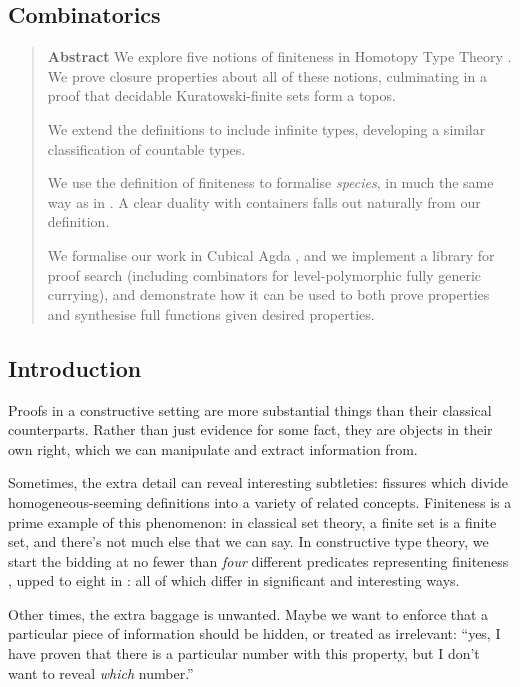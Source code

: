 \begin{refsection}
\newcommand{\pifun}[2]{\prod_{\left( \mathit{ #1 } : #2 \right)}}
\chapter{Combinatorics}
\begin{quote}
  \textbf{Abstract}
  We explore five notions of finiteness in Homotopy Type Theory \cite{hottbook}.
  We prove closure properties about all of these notions, culminating in a proof
  that decidable Kuratowski-finite sets form a topos.

  We extend the definitions to include infinite types, developing a similar
  classification of countable types.

  We use the definition of finiteness to formalise \emph{species}, in much
  the same way as in \cite{yorgeyCombinatorialSpeciesLabelled2014}.
  A clear duality with containers
  \cite{abbottContainersConstructingStrictly2005} falls out naturally from our
  definition.

  We formalise our work in Cubical Agda
  \cite{vezzosiCubicalAgdaDependently2019}, and we implement a library for proof
  search (including combinators for level-polymorphic fully generic currying),
  and demonstrate how it can be used to both prove properties and synthesise
  full functions given desired properties.
\end{quote}
\section{Introduction}
Proofs in a constructive setting are more substantial things than their
classical counterparts.
Rather than just evidence for some fact, they are objects in their own right,
which we can manipulate and extract information from.

Sometimes, the extra detail can reveal interesting subtleties: fissures which
divide homogeneous-seeming definitions into a variety of related concepts.
Finiteness is a prime example of this phenomenon: in classical set theory, a
finite set is a finite set, and there's not much else that we can say.
In constructive type theory, we start the bidding at no fewer than \emph{four}
different predicates representing finiteness
\cite{spiwackConstructivelyFinite2010}, upped to eight in
\cite{firsovVariationsNoetherianness2016a}: all of which differ in significant
and interesting ways.

Other times, the extra baggage is unwanted.
Maybe we want to enforce that a particular piece of information should be
hidden, or treated as irrelevant: ``yes, I have proven that there is a
particular number with this property, but I don't want to reveal \emph{which}
number.''


\end{refsection}
